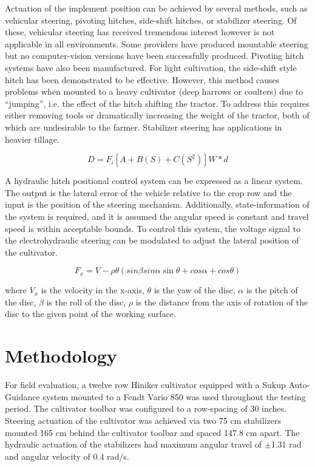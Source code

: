 Actuation of the implement position can be achieved by several
methods, such as vehicular steering, pivoting hitches, side-shift
hitches, or stabilizer steering. Of these, vehicular steering has
received tremendous interest however is not applicable in all
environments. Some providers have produced mountable steering but no
computer-vision versions have been successfully produced. Pivoting
hitch systems have also been manufactured. For light cultivation, the
side-shift style hitch has been demonstrated to be effective. However,
this method causes problems when mounted to a heavy cultivator (deep
harrows or coulters) due to “jumping”, i.e. the effect of the hitch
shifting the tractor. To address this requires either removing tools
or dramatically increasing the weight of the tractor, both of which
are undesirable to the farmer. Stabilizer steering has applications in
heavier tillage.

\begin{equation}
  D = F_{i} \left[ A + B(S) + C(S^2) \right] W * d
  \label{eq:soil_resistance}
\end{equation}

A hydraulic hitch positional control system can be expressed as a
linear system. The output is the lateral error of the vehicle relative
to the crop row and the input is the position of the steering
mechanism. Additionally, state-information of the system is required,
and it is assumed the angular speed is constant and travel speed is
within acceptable bounds. To control this system, the voltage signal
to the electrohydraulic steering can be modulated to adjust the
lateral position of the cultivator.

\begin{equation}
  F_x = V - \rho\theta(sin \beta sin \alpha \sin \theta + cos \alpha +
  cos \theta)
  \label{eq:horizontal_velocity}
\end{equation}
\begin{flushleft}
where $V_x$ is the velocity in the x-axis, $\theta$ is the yaw of the
disc, $\alpha$ is the pitch of the
disc, $\beta$ is the roll of the disc, $\rho$ is the distance from
the axis of rotation of the disc to the given point of the working surface.
\end{flushleft}

\section{Methodology}
For field evaluation, a twelve row Hiniker cultivator equipped with a
Sukup Auto-Guidance system mounted to a Fendt Vario 850 was used
throughout the testing period. The cultivator toolbar was configured
to a row-spacing of 30 inches. Steering actuation of the cultivator
was achieved via two 75 cm stabilizers mounted 165 cm behind the
cultivator toolbar and spaced 147.8 cm apart. The hydraulic actuation
of the stabilizers had maximum angular travel of $\pm$1.31 rad and angular
velocity of 0.4 rad/s.

